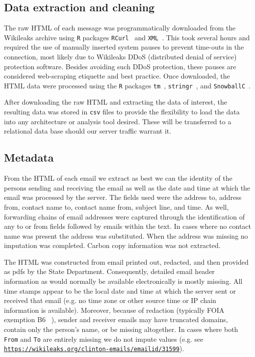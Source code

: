 \documentclass[journal]{vgtc}                %
\begin{document}
\subsection{Data extraction and cleaning}
\label{sect:data:extrclean}
The raw HTML of each message was programmatically downloaded from the Wikileaks archive using \texttt{R} packages  \texttt{RCurl}~\cite{RCurl2016package} and \texttt{XML}~\cite{XML2016package}.  This took several hours and required the use of manually inserted system pauses to prevent time-outs in the connection, most likely due to Wikileaks DDoS (distributed denial of service) protection software. Besides avoiding such DDoS protection, these pauses are considered web-scraping etiquette and best practice.
Once downloaded, the HTML data were processed using the \texttt{R} packages \texttt{tm}~\cite{tm2008paper, tm2017package}, \texttt{stringr}~\cite{stringr2016package}, and \texttt{SnowballC}~\cite{snowballc2014package}.   

After downloading the raw HTML and extracting the data of interest, the resulting data was stored in \texttt{csv} files to provide the flexibility to load the data into any architecture or analysis tool desired.  These will be transferred to a relational data base should our server traffic warrant it.

\subsection{Metadata}
\label{sect:data:metadata}
From the HTML of each email we extract as best we can the identity of the persons sending and receiving the email as well as the date and time at which the email was processed by the server. The fields used were the address to, address from, contact name to, contact name from, subject line, and time. As well, forwarding chains of email addresses were captured through the identification of any to or from fields followed by emails within the text. In cases where no contact name was present the address was substituted. When the address was missing no imputation was completed. Carbon copy information was not extracted.

The HTML was constructed from email printed out, redacted, and then provided as pdfs by the State Department.  Consequently, detailed email header information as would normally be available electronically is mostly missing.   All time stamps appear to be the local date and time at which the server sent or received that email (e.g. no time zone or other source time or IP chain information is available).  Moreover, because of redaction (typically FOIA exemption B6 ~\cite{FOIA}),  sender and receiver emails may have truncated domains,  contain only the person's name, or be missing altogether.  In cases where both \texttt{From} and \texttt{To} are entirely missing we do not impute values  (e.g. see \href{https://wikileaks.org/clinton-emails/emailid/31599}{\color {blue} \texttt{https://wikileaks.org/clinton-emails/emailid/31599}}).
\end{document}
